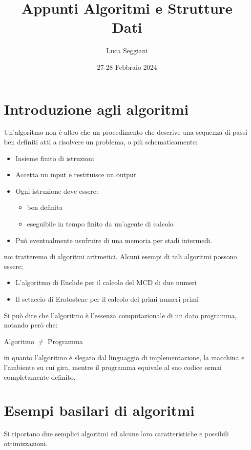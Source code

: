\documentclass[a4paper,12pt]{article}
\title{Appunti Algoritmi e Strutture Dati}
\author{Luca Seggiani}
\date{27-28 Febbraio 2024}
\begin{document}
\maketitle
\section{Introduzione agli algoritmi}
Un'algoritmo non è altro che un procedimento che descrive una sequenza di passi ben definiti atti a risolvere
un problema, o più schematicamente:
\begin{itemize}
  \item Insieme finito di istruzioni
  \item Accetta un input e restituisce un output
  \item Ogni istruzione deve essere:
    \begin{itemize}
      \item ben definita
      \item eseguibile in tempo finito da un'agente di calcolo
    \end{itemize}
  \item Può eventualmente usufruire di una memoria per stadi intermedi.
\end{itemize}

noi tratteremo di algoritmi aritmetici. Alcuni esempi di tali algoritmi possono essere;
\begin{itemize}
  \item L'algoritmo di Euclide per il calcolo del MCD di due numeri
    \item Il setaccio di Eratostene per il calcolo dei primi numeri primi
\end{itemize}

Si può dire che l'algoritmo è l'essenza computazionale di un dato programma, notando però che: \\
\begin{center}
Algoritmo $\neq$ Programma
\end{center}
in quanto l'algoritmo è slegato dal linguaggio di implementazione, la macchina e l'ambiente su cui gira, mentre
il programma equivale al suo codice ormai completamente definito.

\section{Esempi basilari di algoritmi}
Si riportano due semplici algoritmi ed alcune loro caratteristiche e possibili ottimizzazioni.
\par\medskip
\end{document}
